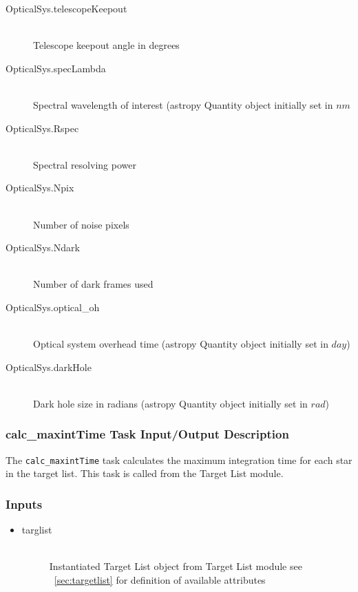\documentclass[cleanfoot]{asme2ej}
\begin{document}
\begin{itemize}
\begin{description}
        \item[OpticalSys.telescopeKeepout] \hfill \\
        Telescope keepout angle in degrees
        \item[OpticalSys.specLambda] \hfill \\
        Spectral wavelength of interest (astropy Quantity object initially set in $ nm $
        \item[OpticalSys.Rspec] \hfill \\
        Spectral resolving power
        \item[OpticalSys.Npix] \hfill \\
        Number of noise pixels
        \item[OpticalSys.Ndark] \hfill \\
        Number of dark frames used
        \item[OpticalSys.optical\_oh] \hfill \\
        Optical system overhead time (astropy Quantity object initially set in $ day $)
        \item[OpticalSys.darkHole] \hfill \\
        Dark hole size in radians (astropy Quantity object initially set in $ rad $)
    \end{description}
\end{itemize}

\subsubsection{calc\_maxintTime Task Input/Output Description} \label{sec:calcmaxintTimetask}
The \verb+calc_maxintTime+ task calculates the maximum integration time for each star in the target list.  This task is called from the Target List module.
\subsubsection*{Inputs}
\begin{itemize}
    \item 
    \begin{description}
        \item[targlist] \hfill \\
        Instantiated Target List object from Target List module see ~\ref{sec:targetlist} for definition of available attributes
    \end{description}
\end{itemize}
\end{document}

